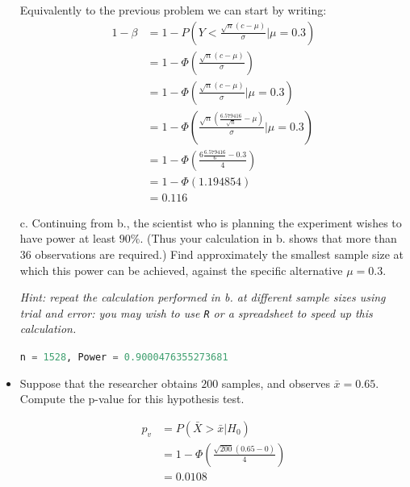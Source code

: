 \documentclass{article}
\newcommand{\1}{\mathbf{1}}
\begin{document}
\begin{itemize}
    Equivalently to the previous problem we can start by writing:
    \begin{align*}
        1 - \beta &=  1- P \left(Y < \frac{\sqrt{n}(c - \mu)}{\sigma}  \bigg | \mu=0.3 \right) \\
        &=  1 - \Phi  \left(\frac{\sqrt{n}(c - \mu)}{\sigma}\right) \\
        &= 1- \Phi\left( \frac{\sqrt{n}(c - \mu)}{\sigma}  \bigg | \mu=0.3 \right) \\
        &= 1- \Phi\left( \frac{\sqrt{n} \left(\frac{6.579416}{\sqrt{n}} - \mu \right)}{\sigma}  \bigg | \mu=0.3 \right) \\
        &= 1- \Phi\left( \frac{6\frac{6.579416}{6} - 0.3}{4} \right) \\
        &= 1- \Phi(1.194854 ) \\
        &= 0.116
    \end{align*}

    \item[c.] Continuing from b., the scientist who is planning the experiment wishes to have power at least $90\%$. (Thus your calculation in b. shows that more than $36$ observations are required.) Find approximately the smallest sample size at which this power can be achieved, against the specific alternative $\mu=0.3$.\par 
    {\it Hint: repeat the calculation performed in {\rm b.} at different sample sizes using trial and error: you may wish to use {\tt R} or a spreadsheet to speed up this calculation.}
    
     \lstinline[language=Python]{n = 1528, Power = 0.9000476355273681}
     
    
   

   \item[d.] Suppose that the researcher obtains $200$ samples, and observes $\bar{x} = 0.65$. Compute the p-value for this hypothesis test.
   
   \begin{align*}
       p_v &= P(\bar X > \bar x | H_0) \\
       &= 1 - \Phi \left( \frac{\sqrt{200}(0.65 - 0)}{4} \right)\\
       &= 0.0108
   \end{align*}
\end{itemize}


\newpage
\end{document}
